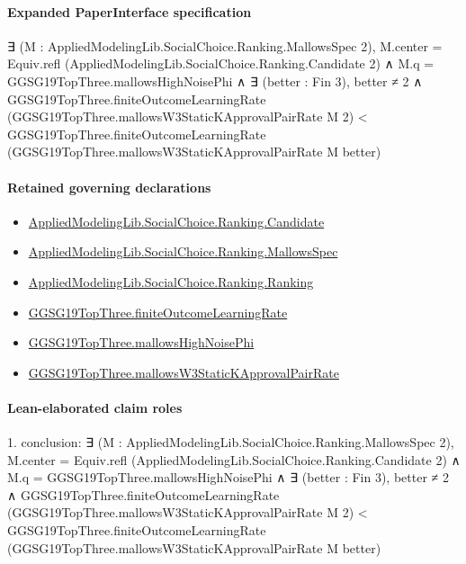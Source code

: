 \documentclass[10pt]{article}
\begin{document}
\paragraph{Expanded PaperInterface specification}
\begin{ReviewVerbatim}
∃ (M : AppliedModelingLib.SocialChoice.Ranking.MallowsSpec 2),
  M.center = Equiv.refl (AppliedModelingLib.SocialChoice.Ranking.Candidate 2) ∧
    M.q = GGSG19TopThree.mallowsHighNoisePhi ∧
      ∃ (better : Fin 3),
        better ≠ 2 ∧
          GGSG19TopThree.finiteOutcomeLearningRate (GGSG19TopThree.mallowsW3StaticKApprovalPairRate M 2) <
            GGSG19TopThree.finiteOutcomeLearningRate (GGSG19TopThree.mallowsW3StaticKApprovalPairRate M better)
\end{ReviewVerbatim}

\paragraph{Retained governing declarations}
\begin{itemize}\raggedright
\item \hyperlink{governing-declaration-8c0e6c25845ae78a}{Applied\allowbreak{}Modeling\allowbreak{}Lib.\allowbreak{}Social\allowbreak{}Choice.\allowbreak{}Ranking.\allowbreak{}Candidate}
\item \hyperlink{governing-declaration-31df9a4e6bd48c5e}{Applied\allowbreak{}Modeling\allowbreak{}Lib.\allowbreak{}Social\allowbreak{}Choice.\allowbreak{}Ranking.\allowbreak{}Mallows\allowbreak{}Spec}
\item \hyperlink{governing-declaration-5cde54446d1ae021}{Applied\allowbreak{}Modeling\allowbreak{}Lib.\allowbreak{}Social\allowbreak{}Choice.\allowbreak{}Ranking.\allowbreak{}Ranking}
\item \hyperlink{governing-declaration-6ccba7634ffd53cd}{GGSG19\allowbreak{}Top\allowbreak{}Three.\allowbreak{}finite\allowbreak{}Outcome\allowbreak{}Learning\allowbreak{}Rate}
\item \hyperlink{governing-declaration-7af29de89c6b4c39}{GGSG19\allowbreak{}Top\allowbreak{}Three.\allowbreak{}mallows\allowbreak{}High\allowbreak{}Noise\allowbreak{}Phi}
\item \hyperlink{governing-declaration-3524d846417b271a}{GGSG19\allowbreak{}Top\allowbreak{}Three.\allowbreak{}mallows\allowbreak{}W3\allowbreak{}Static\allowbreak{}K\allowbreak{}Approval\allowbreak{}Pair\allowbreak{}Rate}
\end{itemize}
\paragraph{Lean-elaborated claim roles}\begin{ReviewVerbatim}
1. conclusion: ∃ (M : AppliedModelingLib.SocialChoice.Ranking.MallowsSpec 2),
  M.center = Equiv.refl (AppliedModelingLib.SocialChoice.Ranking.Candidate 2) ∧
    M.q = GGSG19TopThree.mallowsHighNoisePhi ∧
      ∃ (better : Fin 3),
        better ≠ 2 ∧
          GGSG19TopThree.finiteOutcomeLearningRate (GGSG19TopThree.mallowsW3StaticKApprovalPairRate M 2) <
            GGSG19TopThree.finiteOutcomeLearningRate (GGSG19TopThree.mallowsW3StaticKApprovalPairRate M better)
\end{ReviewVerbatim}
\end{document}
